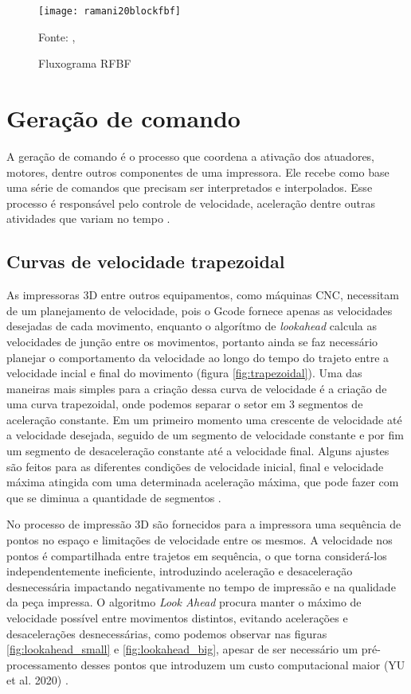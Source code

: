 \begin{figure}[!htb]
    \centering
    \caption{Fluxograma RFBF}
    \texttt{[image: ramani20blockfbf]}

    {\footnotesize Fonte: \citeauthor{ramani20}, \citeyear{ramani20}}
    \label{fig:flowchart_rfbf}
\end{figure}

\section{Geração de comando}
A geração de comando é o processo que coordena a ativação dos 
atuadores, motores, dentre outros componentes de uma impressora. 
Ele recebe como base uma série de comandos que precisam ser 
interpretados e interpolados. Esse processo é responsável pelo 
controle de velocidade, aceleração dentre outras atividades que 
variam no tempo \cite{yu20}. 

\subsection{Curvas de velocidade trapezoidal}
As impressoras 3D entre outros equipamentos, como máquinas CNC, necessitam
de um planejamento de velocidade, pois o Gcode fornece apenas as velocidades desejadas
de cada movimento, enquanto o algorítmo de \textit{lookahead} calcula as velocidades
de junção entre os movimentos, portanto ainda se faz necessário planejar
o comportamento da velocidade ao longo do tempo do trajeto entre a velocidade incial
e final do movimento (figura \ref{fig:trapezoidal}).
Uma das maneiras mais simples para a criação dessa curva de velocidade é
a criação de uma curva trapezoidal, onde podemos separar o setor em 3 segmentos
de aceleração constante. Em um primeiro momento uma crescente de velocidade até
a velocidade desejada, seguido de um segmento de velocidade constante e por fim
um segmento de desaceleração constante até a velocidade final.
Alguns ajustes são feitos para as diferentes condições de velocidade inicial, final e
velocidade máxima atingida com uma determinada aceleração máxima, que pode
fazer com que se diminua a quantidade de segmentos \cite{yu20,klipperkinematic}.



No processo de impressão 3D são fornecidos para a impressora 
uma sequência de pontos no espaço e limitações de velocidade 
entre os mesmos. A velocidade nos pontos é compartilhada entre 
trajetos em sequência, o que torna considerá-los 
independentemente ineficiente, introduzindo aceleração e 
desaceleração desnecessária impactando negativamente no tempo 
de impressão e na qualidade da peça impressa.
O algoritmo \textit{Look Ahead} procura manter o máximo de velocidade 
possível entre movimentos distintos, evitando acelerações e 
desacelerações desnecessárias, como podemos observar nas figuras 
\ref{fig:lookahead_small} e \ref{fig:lookahead_big}, 
apesar de ser necessário um 
pré-processamento desses pontos que introduzem um custo 
computacional maior (YU et al. 2020) \cite{yu20, klipperkinematic}.

